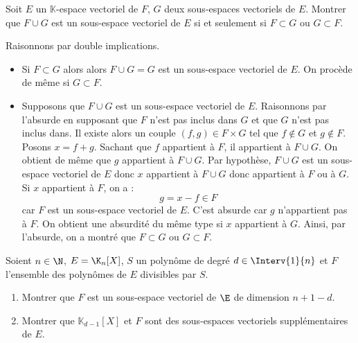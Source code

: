 \documentclass[a4paper,10pt]{report}
\begin{document}
\begin{Exercice}{} Soit $E$ un $\mathbb{K}$-espace vectoriel de $F$, $G$ deux sous-espaces vectoriels de $E$. Montrer que $F \cup G$ est un sous-espace vectoriel de $E$ si et seulement si $F \subset G$ ou $G \subset F$.
\end{Exercice}

\corr Raisonnons par double implications.

\begin{itemize}
\item Si $F \subset G$ alors alors $F \cup G = G$ est un sous-espace vectoriel de $E$. On procède de même si $G \subset F$.
\item Supposons que $F \cup G$ est un sous-espace vectoriel de $E$. Raisonnons par l'absurde en supposant que $F$ n'est pas inclus dans $G$ et que $G$ n'est pas inclus dans. Il existe alors un couple $(f,g) \in F \times G$ tel que $f \notin G$ et $g \notin F$. Posons $x=f+g$. Sachant que $f$ appartient à $F$, il appartient à $F \cup G$. On obtient de même que $g$ appartient à $F \cup G$. Par hypothèse, $F \cup G$ est un sous-espace vectoriel de $E$ donc $x$ appartient à $F \cup G$ donc appartient à $F$ ou à $G$. Si $x$ appartient à $F$, on a :
$$ g = x-f \in F$$
car $F$ est un sous-espace vectoriel de $E$. C'est absurde car $g$ n'appartient pas à $F$. On obtient une absurdité du même type si $x$ appartient à $G$. Ainsi, par l'absurde, on a montré que $F \subset G$ ou $G \subset F$. 
\end{itemize}

\begin{Exercice}{} Soient $n\in\N$, $E=\K_n[X]$, $S$ un polynôme de degré $d \in \Interv{1}{n}$ et $F$ l'ensemble des polynômes de $E$ divisibles par $S$.
\begin{enumerate}
	\item Montrer que $F$ est un sous-espace vectoriel de $\E$ de dimension $n+1-d$.
	\item Montrer que $\mathbb{K}_{d-1}[X]$  et $F$ sont des sous-espaces vectoriels supplémentaires de $E$.
\end{enumerate} 
\end{Exercice}
\end{document}
